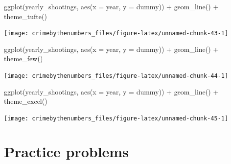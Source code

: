 \documentclass[
]{krantz}
\makeatletter
\newenvironment{Shaded}{\begin{snugshade}}{\end{snugshade}}
\newcommand{\AttributeTok}[1]{\textcolor[rgb]{0.61,0.61,0.61}{#1}}
\newcommand{\FunctionTok}[1]{\textcolor[rgb]{0,0,0}{#1}}
\newcommand{\NormalTok}[1]{#1}
\newcommand{\SpecialCharTok}[1]{\textcolor[rgb]{0,0,0}{#1}}
\newenvironment{kframe}{%
\medskip{}
\setlength{\fboxsep}{.8em}
 \def\at@end@of@kframe{}%
 \ifinner\ifhmode%
  \def\at@end@of@kframe{\end{minipage}}%
  \begin{minipage}{\columnwidth}%
 \fi\fi%
 \def\FrameCommand##1{\hskip\@totalleftmargin \hskip-\fboxsep
 \colorbox{shadecolor}{##1}\hskip-\fboxsep
     \hskip-\linewidth \hskip-\@totalleftmargin \hskip\columnwidth}%
 \MakeFramed {\advance\hsize-\width
   \@totalleftmargin\z@ \linewidth\hsize
   \@setminipage}}%
 {\par\unskip\endMakeFramed%
 \at@end@of@kframe}
\renewenvironment{Shaded}{\begin{kframe}}{\end{kframe}}
\makeatother
\begin{document}
\begin{Shaded}
\begin{Highlighting}[]
\FunctionTok{ggplot}\NormalTok{(yearly\_shootings, }\FunctionTok{aes}\NormalTok{(}\AttributeTok{x =}\NormalTok{ year, }\AttributeTok{y =}\NormalTok{ dummy)) }\SpecialCharTok{+}
  \FunctionTok{geom\_line}\NormalTok{() }\SpecialCharTok{+}
  \FunctionTok{theme\_tufte}\NormalTok{()}
\end{Highlighting}
\end{Shaded}

\begin{center}\texttt{[image: crimebythenumbers\_files/figure-latex/unnamed-chunk-43-1]} \end{center}

\begin{Shaded}
\begin{Highlighting}[]
\FunctionTok{ggplot}\NormalTok{(yearly\_shootings, }\FunctionTok{aes}\NormalTok{(}\AttributeTok{x =}\NormalTok{ year, }\AttributeTok{y =}\NormalTok{ dummy)) }\SpecialCharTok{+}
  \FunctionTok{geom\_line}\NormalTok{() }\SpecialCharTok{+}
  \FunctionTok{theme\_few}\NormalTok{()}
\end{Highlighting}
\end{Shaded}

\begin{center}\texttt{[image: crimebythenumbers\_files/figure-latex/unnamed-chunk-44-1]} \end{center}

\begin{Shaded}
\begin{Highlighting}[]
\FunctionTok{ggplot}\NormalTok{(yearly\_shootings, }\FunctionTok{aes}\NormalTok{(}\AttributeTok{x =}\NormalTok{ year, }\AttributeTok{y =}\NormalTok{ dummy)) }\SpecialCharTok{+}
  \FunctionTok{geom\_line}\NormalTok{() }\SpecialCharTok{+}
  \FunctionTok{theme\_excel}\NormalTok{()}
\end{Highlighting}
\end{Shaded}

\begin{center}\texttt{[image: crimebythenumbers\_files/figure-latex/unnamed-chunk-45-1]} \end{center}

\hypertarget{practice-problems-9}{%
\section{Practice problems}\label{practice-problems-9}}
\end{document}

